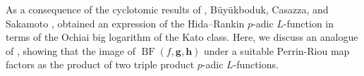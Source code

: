 \documentclass[a4paper,11pt]{amsart}
\theoremstyle{plain}
\theoremstyle{definition}
\theoremstyle{remark}
\newcommand{\bb}{\mathbb}
\DeclareMathOperator{\BF}{BF}
\DeclareMathOperator{\cris}{cris}
\DeclareMathOperator{\cyc}{cyc}
\DeclareMathOperator{\bal}{bal}
\newcommand{\hf}{{\mathbf{f}}}
\newcommand{\hg}{{\mathbf{g}}}
\newcommand{\hh}{{\mathbf h}}
\numberwithin{equation}{section}
\begin{document}
As a consequence of the cyclotomic results of \cite{BDV}, B\"uy\"ukboduk, Casazza, and Sakamoto \cite{BC}, \cite{BS} obtained an expression of the Hida--Rankin $p$-adic $L$-function in terms of the Ochiai big logarithm of the Kato class. Here, we discuss an analogue of \cite[Prop. 8.9]{BC}, showing that the image of $\BF(f,\hg,\hh)$ under a suitable Perrin-Riou map factors as the product of two triple product $p$-adic $L$-functions. 

\end{document}
